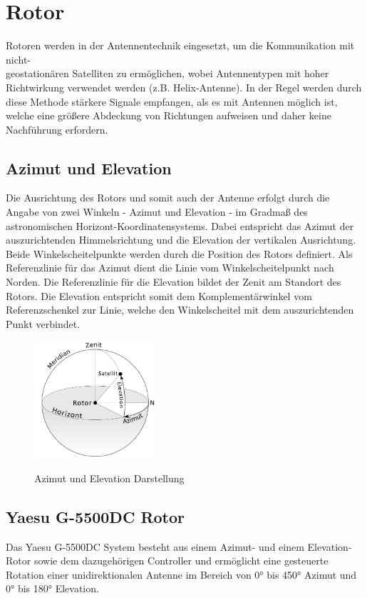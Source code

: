 \chapter{Rotor}
Rotoren werden in der Antennentechnik eingesetzt, um die Kommunikation mit nicht-\\geostationären Satelliten zu ermöglichen, wobei Antennentypen mit hoher Richtwirkung verwendet werden (z.B. Helix-Antenne). In der Regel werden durch diese Methode stärkere Signale empfangen, als es mit Antennen möglich ist, welche eine größere Abdeckung von Richtungen aufweisen und daher keine Nachführung erfordern. 
\section{Azimut und Elevation}
Die Ausrichtung des Rotors und somit auch der Antenne erfolgt durch die Angabe von zwei Winkeln - Azimut und Elevation - im Gradmaß des astronomischen Horizont-Koordinatensystems. Dabei entspricht das Azimut der auszurichtenden Himmelsrichtung und die Elevation der vertikalen Ausrichtung. Beide Winkelscheitelpunkte werden durch die Position des Rotors definiert. Als Referenzlinie für das Azimut dient die Linie vom Winkelscheitelpunkt nach Norden. Die Referenzlinie für die Elevation bildet der Zenit am Standort des Rotors. Die Elevation entspricht somit dem Komplementärwinkel vom Referenzschenkel zur Linie, welche den Winkelscheitel mit dem auszurichtenden Punkt verbindet. \cite{noauthor_astronomische_nodate}

\begin{figure}[H]
	\centering
	\includegraphics[width=4.5cm]{../ref/Azimuth-Altitude_schematic_satellit.png}
	\label{fig:Azimut_Elevation_Schematic}
	\caption{Azimut und Elevation Darstellung \cite{twcarlson_azimuth_2020}}
\end{figure}

\section{Yaesu G-5500DC Rotor}
\label{sec:yaesug5500dc}
Das Yaesu G-5500DC System besteht aus einem Azimut- und einem Elevation-Rotor sowie dem dazugehörigen Controller und ermöglicht eine gesteuerte Rotation einer unidirektionalen Antenne im Bereich von 0° bis 450° Azimut und 0° bis 180° Elevation. \cite{noauthor_yaesu_nodate}

